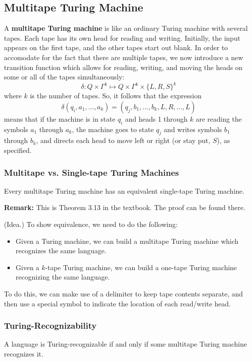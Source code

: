 \documentclass[letterpaper]{article}
\begin{document}
\subsection{Multitape Turing Machine}
A \textbf{multitape Turing machine} is like an ordinary Turing machine with several tapes. Each tape has its own head for reading and writing. Initially, the input appears on the first tape, and the other tapes start out blank. In order to accomodate for the fact that there are multiple tapes, we now introduce a new transition function which allows for reading, writing, and moving the heads on some or all of the tapes simultaneously:
\[\delta: Q \times \Gamma^k \mapsto Q \times \Gamma^k \times \{L, R, S\}^k\]
where $k$ is the number of tapes. So, it follows that the expression 
\[\delta(q_i, a_1, \dots, a_k) = (q_j, b_1, \dots, b_k, L, R, \dots, L)\]
means that if the machine is in state $q_i$ and heads 1 through $k$ are reading the symbols $a_1$ through $a_k$, the machine goes to state $q_j$ and writes symbols $b_1$ through $b_k$, and directs each head to move left or right (or stay put, $S$), as specified. 

\subsubsection{Multitape vs. Single-tape Turing Machines}
\begin{theorem}{}{}
    Every multitape Turing machine has an equivalent single-tape Turing machine.
\end{theorem}
\textbf{Remark:} This is Theorem 3.13 in the textbook. The proof can be found there. 

\begin{mdframed}[]
    (Idea.) To show equivalence, we need to do the following: 
    \begin{itemize}
        \item Given a Turing machine, we can build a multitape Turing machine which recognizes the same language. 
        \item Given a $k$-tape Turing machine, we can build a one-tape Turing machine recognizing the same language. 
    \end{itemize}
    To do this, we can make use of a delimiter to keep tape contents separate, and then use a special symbol to indicate the location of each read/write head. 
\end{mdframed}

\subsubsection{Turing-Recognizability}
\begin{corollary}{}{}
    A language is Turing-recognizable if and only if some multitape Turing machine recognizes it.
\end{corollary}
\end{document}
